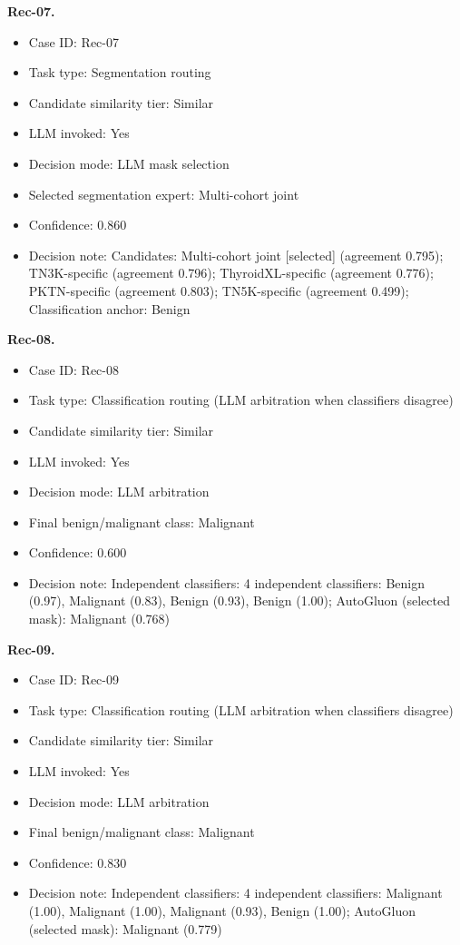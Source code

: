 \noindent\textbf{\textbf{Rec-07}.}\par
\begin{itemize}[leftmargin=1.5em,topsep=0.1em,itemsep=0.05em]
\item Case ID: Rec-07
\item Task type: Segmentation routing
\item Candidate similarity tier: Similar
\item LLM invoked: Yes
\item Decision mode: LLM mask selection
\item Selected segmentation expert: Multi-cohort joint
\item Confidence: 0.860
\item Decision note: Candidates: Multi-cohort joint [selected] (agreement 0.795); TN3K-specific (agreement 0.796); ThyroidXL-specific (agreement 0.776); PKTN-specific (agreement 0.803); TN5K-specific (agreement 0.499); Classification anchor: Benign
\end{itemize}
\noindent\textbf{Rec-08.}\par
\begin{itemize}[leftmargin=1.5em,topsep=0.1em,itemsep=0.05em]
\item Case ID: Rec-08
\item Task type: Classification routing (LLM arbitration when classifiers disagree)
\item Candidate similarity tier: Similar
\item LLM invoked: Yes
\item Decision mode: LLM arbitration
\item Final benign/malignant class: Malignant
\item Confidence: 0.600
\item Decision note: Independent classifiers: 4 independent classifiers: Benign (0.97), Malignant (0.83), Benign (0.93), Benign (1.00); AutoGluon (selected mask): Malignant (0.768)
\end{itemize}
\noindent\textbf{Rec-09.}\par
\begin{itemize}[leftmargin=1.5em,topsep=0.1em,itemsep=0.05em]
\item Case ID: Rec-09
\item Task type: Classification routing (LLM arbitration when classifiers disagree)
\item Candidate similarity tier: Similar
\item LLM invoked: Yes
\item Decision mode: LLM arbitration
\item Final benign/malignant class: Malignant
\item Confidence: 0.830
\item Decision note: Independent classifiers: 4 independent classifiers: Malignant (1.00), Malignant (1.00), Malignant (0.93), Benign (1.00); AutoGluon (selected mask): Malignant (0.779)
\end{itemize}
